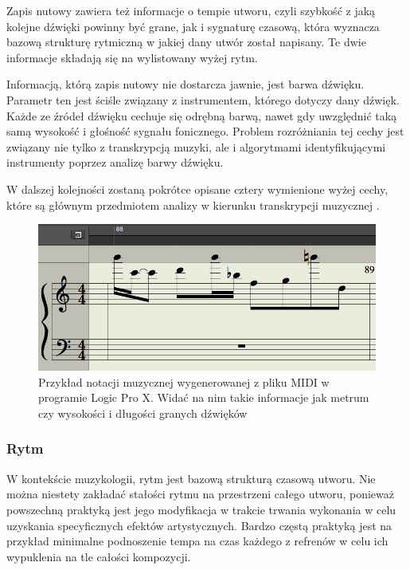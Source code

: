 \documentclass[12pt,a4paper,twoside]{mwart}
\begin{document}
Zapis nutowy zawiera też informacje o tempie utworu, czyli szybkość z jaką kolejne dźwięki powinny być grane, jak i sygnaturę czasową, która wyznacza bazową strukturę rytmiczną w jakiej dany utwór został napisany. Te dwie informacje składają się na wylistowany wyżej rytm.

Informacją, którą zapis nutowy nie dostarcza jawnie, jest barwa dźwięku. Parametr ten jest ściśle związany z instrumentem, którego dotyczy dany dźwięk. Każde ze źródeł dźwięku cechuje się odrębną barwą, nawet gdy uwzględnić taką samą wysokość i głośność sygnału fonicznego. Problem rozróżniania tej cechy jest związany nie tylko z transkrypcją muzyki, ale i algorytmami identyfikującymi instrumenty poprzez analizę barwy dźwięku.

W dalszej kolejności zostaną pokrótce opisane cztery wymienione wyżej cechy, które są głównym przedmiotem analizy w kierunku transkrypcji muzycznej \cite[63]{Homerecording:DlaKazdego}.
\begin{figure}[H]
  \begin{center}
    \includegraphics[scale=0.5]{images/pieciolinia_logic.png}
    \caption{Przykład notacji muzycznej wygenerowanej z pliku MIDI w programie Logic Pro X. Widać na nim takie informacje jak metrum czy wysokości i długości granych dźwięków}
  \end{center}
\end{figure}
\subsubsection{Rytm}

W kontekście muzykologii, rytm jest bazową strukturą czasową utworu. Nie można niestety zakładać stałości rytmu na przestrzeni całego utworu, ponieważ powszechną praktyką jest jego modyfikacja w trakcie trwania wykonania w celu uzyskania specyficznych efektów artystycznych. Bardzo częstą praktyką jest na przykład minimalne podnoszenie tempa na czas każdego z refrenów w celu ich wypuklenia na tle całości kompozycji.
\end{document}
